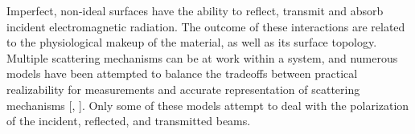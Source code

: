 Imperfect, non-ideal surfaces have the ability to reflect, transmit and absorb incident electromagnetic radiation.  The outcome of these interactions are related to the physiological makeup of the material, as well as its surface topology.  Multiple scattering mechanisms can be at work within a system, and numerous models have been attempted to balance the tradeoffs between practical realizability for measurements and accurate representation of scattering mechanisms [\cite{priest}, \cite{pbrdf}].  Only some of these models attempt to deal with the polarization of the incident, reflected, and transmitted beams.
